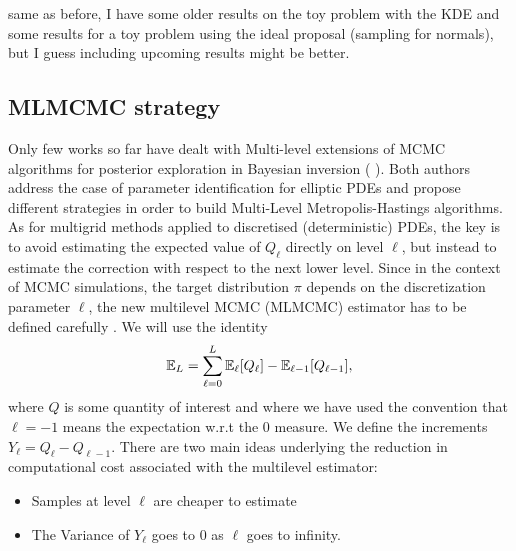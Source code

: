\color{red} same as before, I have some older results on the toy problem with the KDE and some results for a toy problem using the ideal proposal (sampling for normals), but I guess including upcoming results might be better.\color{black}
\subsection{MLMCMC strategy}






\hspace*{0.3cm}
Only few works so far have dealt with Multi-level extensions of MCMC algorithms for posterior exploration in Bayesian inversion (\cite{hoang2013complexity} \cite{dodwell2015hierarchical}). Both authors address the case of parameter identification for elliptic PDEs and propose different strategies in order to build Multi-Level Metropolis-Hastings algorithms. 
As for multigrid methods applied to discretised (deterministic) PDEs, the key is to avoid estimating
the expected value of $Q_\ell$ directly on level $\ell$, but instead to estimate the correction with respect to the
next lower level. Since in the context of MCMC simulations, the target distribution $\pi$
depends on the discretization parameter $\ell$,
the new multilevel MCMC (MLMCMC) estimator has to be defined carefully \cite{dodwell2015hierarchical}. We will use the identity
$$\mathbb{E}_L=\sum_{\ell=0}^{L}\mathbb{E}_{\ell}[Q_\ell]-\mathbb{E}_{\ell-1}[Q_{\ell-1}],$$ where $Q$ is some quantity of interest and where we have used the convention that $\ell=-1$ means the expectation w.r.t the 0 measure. We define the increments $Y_\ell=Q_\ell-Q_{\ell-1}$. There are two main ideas  underlying the reduction in computational cost associated with
the multilevel estimator: \begin{itemize}
	\item Samples at level $\ell$ are cheaper to estimate
	\item The Variance of $Y_\ell$ goes to 0 as $\ell$ goes to infinity.
\end{itemize}
